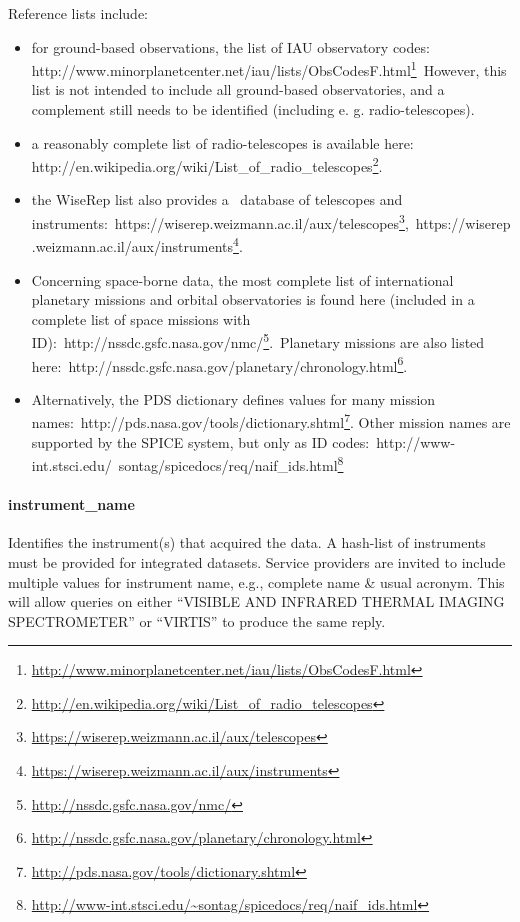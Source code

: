 \documentclass[11pt,a4paper]{ivoa}
\begin{document}
Reference lists include:

\begin{itemize}
\item for ground-based observations, the list of IAU observatory codes: http://www.minorplanetcenter.net/iau/lists/ObsCodesF.html\footnote{\url{http://www.minorplanetcenter.net/iau/lists/ObsCodesF.html}} However, this list is not intended to include all ground-based observatories, and a complement still needs to be identified (including e. g. radio-telescopes). 
\item a reasonably complete list of radio-telescopes is available here: http://en.wikipedia.org/wiki/List\_of\_radio\_telescopes\footnote{\url{http://en.wikipedia.org/wiki/List_of_radio_telescopes}}.
\item the WiseRep list also provides a  database of telescopes and instruments: https://wiserep.weizmann.ac.il/aux/telescopes\footnote{\url{https://wiserep.weizmann.ac.il/aux/telescopes}}, https://wiserep.weizmann.ac.il/aux/instruments\footnote{\url{https://wiserep.weizmann.ac.il/aux/instruments}}. 
\item Concerning space-borne data, the most complete list of international planetary missions and orbital observatories is found here (included in a complete list of space missions with ID): http://nssdc.gsfc.nasa.gov/nmc/\footnote{\url{http://nssdc.gsfc.nasa.gov/nmc/}}. Planetary missions are also listed here: http://nssdc.gsfc.nasa.gov/planetary/chronology.html\footnote{\url{http://nssdc.gsfc.nasa.gov/planetary/chronology.html}}. 
\item Alternatively, the PDS dictionary defines values for many mission names: http://pds.nasa.gov/tools/dictionary.shtml\footnote{\url{http://pds.nasa.gov/tools/dictionary.shtml}}. Other mission names are supported by the SPICE system, but only as ID codes: http://www-int.stsci.edu/~sontag/spicedocs/req/naif\_ids.html\footnote{\url{http://www-int.stsci.edu/~sontag/spicedocs/req/naif_ids.html}}
\end{itemize}

\paragraph{instrument\_name}

Identifies the instrument(s) that acquired the data. A hash-list of instruments must be provided for integrated datasets. Service providers are invited to include multiple values for instrument name, e.g., complete name \& usual acronym. This will allow queries on either ``VISIBLE AND INFRARED THERMAL IMAGING SPECTROMETER'' or ``VIRTIS'' to produce the same reply. 
\end{document}
